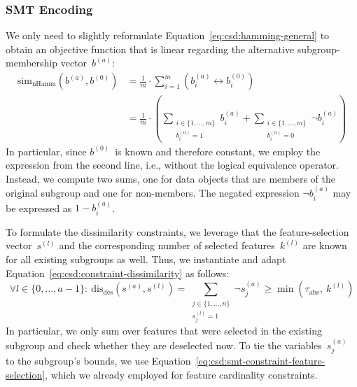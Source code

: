 \documentclass{article}
\theoremstyle{definition}
\begin{document}
\subsubsection{SMT Encoding}
\label{sec:csd:approach:alternatives:smt}

We only need to slightly reformulate Equation~\ref{eq:csd:hamming-general} to obtain an objective function that is linear regarding the alternative subgroup-membership vector~$b^{(a)}$:
%
\begin{equation}
	\begin{aligned}
		\text{sim}_{\text{nHamm}}(b^{(a)}, b^{(0)}) &= \frac{1}{m} \cdot \sum_{i=1}^m \left( b_i^{(a)} \leftrightarrow b_i^{(0)} \right) \\
		&= \frac{1}{m} \cdot \left( \sum\limits_{\substack{i \in \{1, \dots, m\} \\ b_i^{(0)} = 1}} b_i^{(a)} + \sum\limits_{\substack{i \in \{1, \dots, m\} \\ b_i^{(0)} = 0}} \lnot b_i^{(a)} \right)
	\end{aligned}
	\label{eq:csd:smt-hamming}
\end{equation}
%
In particular, since $b^{(0)}$~is known and therefore constant, we employ the expression from the second line, i.e., without the logical equivalence operator.
Instead, we compute two sums, one for data objects that are members of the original subgroup and one for non-members.
The negated expression $\lnot b_i^{(a)}$ may be expressed as $1 - b_i^{(a)}$.

To formulate the dissimilarity constraints, we leverage that the feature-selection vector~$s^{(l)}$ and the corresponding number of selected features~$k^{(l)}$ are known for all existing subgroups as well.
Thus, we instantiate and adapt Equation~\ref{eq:csd:constraint-dissimilarity} as follows:
%
\begin{equation}
	\forall l \in \{0, \dots, a-1\}:~ \text{dis}_{\text{des}}(s^{(a)}, s^{(l)}) = \sum_{\substack{j \in \{1, \dots, n\} \\ s^{(l)}_j = 1}} \lnot s^{(a)}_j \geq \min \left( \tau_{\text{abs}},~k^{(l)} \right)
	\label{eq:csd:smt-constraint-dissimilarity}
\end{equation}
%
In particular, we only sum over features that were selected in the existing subgroup and check whether they are deselected now.
To tie the variables~$s^{(a)}_j$ to the subgroup's bounds, we use Equation~\ref{eq:csd:smt-constraint-feature-selection}, which we already employed for feature cardinality constraints.
\end{document}
